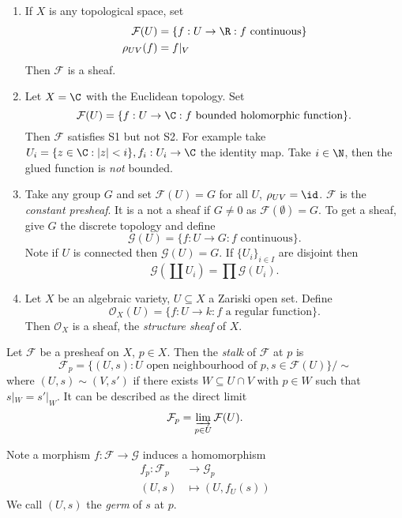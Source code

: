 \documentclass[a4paper]{article}
\newcommand{\sh}[1]{\mathcal{#1}} %
\begin{document}
\begin{eg}\leavevmode
  \begin{enumerate}
  \item If \(X\) is any topological space, set
    \begin{align*}
      \sh F(U) &= \{f: U \to \R: f \text{ continuous}\} \\
      \rho_{UV}(f) &= f|_V
    \end{align*}
    Then \(\sh F\) is a sheaf.
  \item Let \(X = \C\) with the Euclidean topology. Set
    \[
      \sh F(U) = \{f: U \to \C: f \text{ bounded holomorphic function}\}.
    \]
    Then \(\sh F\) satisfies S1 but not S2. For example take \(U_i = \{z \in \C: |z| < i\}, f_i: U_i \to \C\) the identity map. Take \(i \in \N\), then the glued function is \emph{not} bounded.
  \item Take any group \(G\) and set \(\sh F(U) = G\) for all \(U\), \(\rho_{UV} = \id\). \(\sh F\) is the \emph{constant presheaf}. It is a not a sheaf if \(G \neq 0\) as \(\sh F(\emptyset) = G\). To get a sheaf, give \(G\) the discrete topology and define
    \[
      \sh G(U) = \{f: U \to G: f \text{ continuous}\}.
    \]
    Note if \(U\) is connected then \(\sh G(U) = G\). If \(\{U_i\}_{i \in I}\) are disjoint then
    \[
      \sh G(\coprod U_i) = \prod \sh G(U_i).
    \]
  \item Let \(X\) be an algebraic variety, \(U \subseteq X\) a Zariski open set. Define
    \[
      \sh O_X(U) = \{f: U \to k: f \text{ a regular function}\}.
    \]
    Then \(\sh O_X\) is a sheaf, the \emph{structure sheaf} of \(X\).
  \end{enumerate}
\end{eg}

\begin{definition}[stalk]
  Let \(\sh F\) be a presheaf on \(X\), \(p \in X\). Then the \emph{stalk} of \(\sh F\) at \(p\) is
  \[
    \sh F_p = \{(U, s): U \text{ open neighbourhood of } p, s \in \sh F(U)\} / \sim
  \]
  where \((U, s) \sim (V, s')\) if there exists \(W \subseteq U \cap V\) with \(p \in W\) such that \(s|_W = s'|_W\). It can be described as the direct limit
  \[
    \sh F_p = \varinjlim_{p \in U} \sh F(U).
  \]
\end{definition}

Note a morphism \(f: \sh F \to \sh G\) induces a homomorphism
\begin{align*}
  f_p: \sh F_p &\to \sh G_p \\
  (U, s) &\mapsto (U, f_U(s))
\end{align*}
We call \((U, s)\) the \emph{germ} of \(s\) at \(p\).
\end{document}
